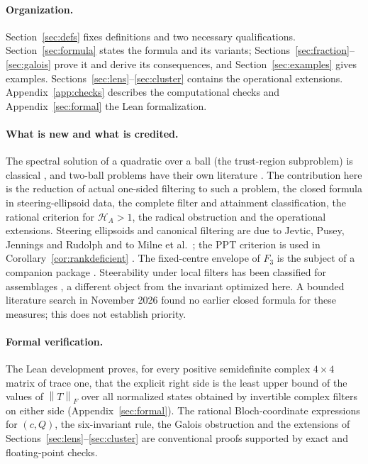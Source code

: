 \documentclass[11pt]{article}
\theoremstyle{remark}\newtheorem{remark}[theorem]{Remark}
\newcommand{\HF}{\mathcal H}
\newcommand{\norm}[1]{\left\lVert#1\right\rVert}
\begin{document}
\paragraph{Organization.}
Section~\ref{sec:defs} fixes definitions and two necessary
qualifications. Section~\ref{sec:formula} states the formula and its
variants; Sections~\ref{sec:fraction}--\ref{sec:galois} prove it and derive
its consequences, and Section~\ref{sec:examples} gives examples. Sections~\ref{sec:lens}--\ref{sec:cluster}
contains the operational extensions. Appendix~\ref{app:checks} describes the
computational checks and Appendix~\ref{sec:formal} the Lean formalization.

\paragraph{What is new and what is credited.}
The spectral solution of a quadratic over a ball (the trust-region
subproblem) is classical \cite{adachi}, and two-ball problems have their own
literature \cite{twoballs,rontsis}. The contribution here is the reduction of
actual one-sided filtering to such a problem, the closed formula in
steering-ellipsoid data, the complete filter and attainment classification,
the rational criterion for $\HF_A>1$, the radical obstruction and the
operational extensions. Steering ellipsoids and canonical filtering are due
to Jevtic, Pusey, Jennings and Rudolph and to Milne et al.\
\cite{jevtic,milne}; the PPT criterion is used in
Corollary~\ref{cor:rankdeficient} \cite{horodecki}. The fixed-centre
envelope of $F_3$ is the subject of a companion package \cite{steeringbounds}.
Steerability under local filters has been classified for assemblages
\cite{ku}, a different object from the invariant optimized here.
A bounded literature search in November 2026 found no earlier closed formula
for these measures; this does not establish priority.

\paragraph{Formal verification.}
The Lean development proves, for every positive semidefinite complex
$4\times4$ matrix of trace one, that the explicit right side is the least
upper bound of the values of $\norm T_F$ over all normalized states obtained
by invertible complex filters on either side (Appendix~\ref{sec:formal}). The
rational Bloch-coordinate expressions for $(c,Q)$, the six-invariant rule,
the Galois obstruction and the extensions of
Sections~\ref{sec:lens}--\ref{sec:cluster} are conventional proofs supported
by exact and floating-point checks.
\end{document}
